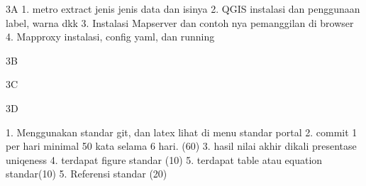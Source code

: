 3A
1. metro extract jenis jenis data dan isinya 
2. QGIS instalasi dan penggunaan label, warna dkk
3. Instalasi Mapserver dan contoh nya pemanggilan di browser
4. Mapproxy instalasi, config yaml, dan running

3B

3C

3D


1. Menggunakan standar git, dan latex lihat di menu standar portal
2. commit 1 per hari minimal 50 kata selama 6 hari. (60)
3. hasil nilai akhir dikali presentase uniqeness
4. terdapat figure standar (10)
5. terdapat table atau equation standar(10)
5. Referensi standar (20)